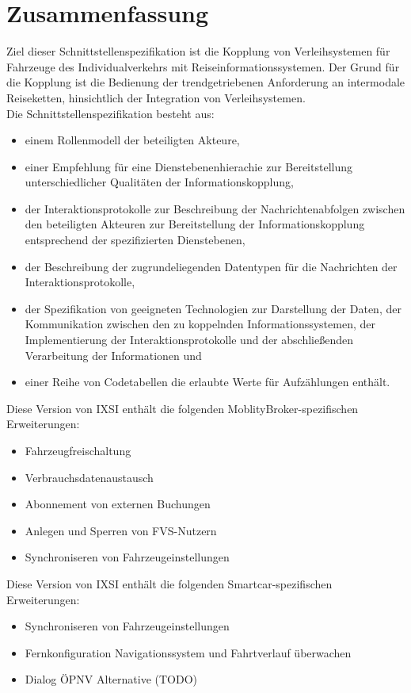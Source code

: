 \chapter{Zusammenfassung}
\label{cha:Zusammenfassung}

Ziel dieser Schnittstellenspezifikation ist die Kopplung von Verleihsystemen für Fahrzeuge des Individualverkehrs mit Reiseinformationssystemen. Der Grund für die Kopplung ist die Bedienung der trendgetriebenen Anforderung an intermodale Reiseketten,  hinsichtlich der Integration von Verleihsystemen.\\

Die Schnittstellenspezifikation besteht aus:\begin{itemize}
\item einem Rollenmodell der beteiligten Akteure,
\item einer Empfehlung für eine Dienstebenenhierachie zur Bereitstellung unterschiedlicher Qualitäten der Informationskopplung,
\item der Interaktionsprotokolle zur Beschreibung der Nachrichtenabfolgen zwischen den beteiligten Akteuren zur Bereitstellung der Informationskopplung entsprechend der spezifizierten Dienstebenen,
\item der Beschreibung der zugrundeliegenden Datentypen für die Nachrichten der Interaktionsprotokolle,
\item der Spezifikation von geeigneten Technologien zur Darstellung der Daten, der Kommunikation zwischen den zu koppelnden Informationssystemen, der Implementierung der Interaktionsprotokolle und der abschließenden Verarbeitung der Informationen und
\item einer Reihe von Codetabellen die erlaubte Werte für Aufzählungen enthält.
\end{itemize}
\bigskip
Diese Version von IXSI enthält die folgenden MoblityBroker-spezifischen Erweiterungen:
\begin{itemize}
\item Fahrzeugfreischaltung
\item Verbrauchsdatenaustausch
\item Abonnement von externen Buchungen
\item Anlegen und Sperren von FVS-Nutzern
\item Synchroniseren von Fahrzeugeinstellungen
\end{itemize}
Diese Version von IXSI enthält die folgenden Smartcar-spezifischen Erweiterungen:
\begin{itemize}
\item Synchroniseren von Fahrzeugeinstellungen
\item Fernkonfiguration Navigationssystem und Fahrtverlauf überwachen
\item Dialog ÖPNV Alternative (TODO)
\end{itemize}
